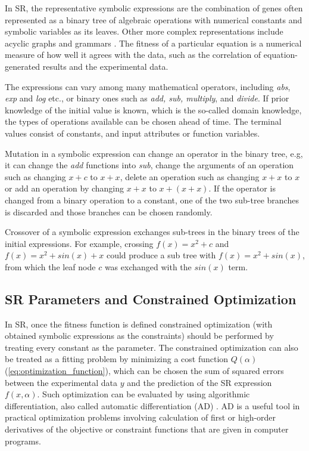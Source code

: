 \documentclass[final,5p,times,twocolumn]{elsarticle}
\begin{document}
In SR, the representative symbolic expressions are the combination of genes often represented as a binary tree of algebraic operations with numerical constants and symbolic variables as its leaves. Other more complex representations include acyclic graphs and grammars \cite{tsoumakas2007multi}. The fitness of a particular equation is a numerical measure of how well it agrees with the data, such as the correlation of equation-generated results and the experimental data.

The expressions can vary among many mathematical operators, including \textit{abs}, \textit{exp} and \textit{log} etc., or binary ones such as \textit{add, sub, multiply}, and \textit{divide}. If prior knowledge of the initial value is known, which is the so-called domain knowledge, the types of operations available can be chosen ahead of time. The terminal values consist of constants, and input attributes or function variables.

Mutation in a symbolic expression can change an operator in the binary tree, e.g, it can change the \textit{add} functions into \textit{sub}, change the arguments of an operation such as changing $x+c$ to $ x+x$, delete an operation such as changing $x+x$ to $ x$ or add an operation by changing $x+x$ to $ x+(x+x)$. If the operator is changed from a binary operation to a constant, one of the two sub-tree branches is discarded and those branches can be chosen randomly.

Crossover of a symbolic expression exchanges sub-trees in the binary trees of the initial expressions.  For example, crossing $f(x) = x^2+c$ and $f(x) = x^2 + sin(x) +x$ could produce a sub tree with $f(x) = x^2+sin(x)$, from which the leaf node $c$ was exchanged with the $sin(x)$ term.

\subsection{SR Parameters and Constrained Optimization} 
 
In SR, once the fitness function is defined constrained optimization {\color{red} (with obtained symbolic expressions as the constraints)} should be performed by treating every constant as the parameter. The constrained optimization can also be treated as a fitting problem by minimizing a cost function $Q(\alpha)$ (\autoref{eq:optimization_function}), which can be chosen the sum of squared errors between the experimental data $y$ and the prediction of the SR expression $f(x,\alpha)$. Such optimization can be evaluated by using algorithmic differentiation, also called automatic differentiation (AD) \cite{neidinger2010introduction}. AD is a useful tool in practical optimization problems involving calculation of first or high-order derivatives of the objective or constraint functions that are given in computer programs. 
\end{document}
